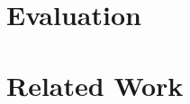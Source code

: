 \documentclass[sigplan,screen]{acmart}
\begin{document}

\section{Evaluation}
\label{sec.eval}


\section{Related Work}
\label{sec.related}
\end{document}
